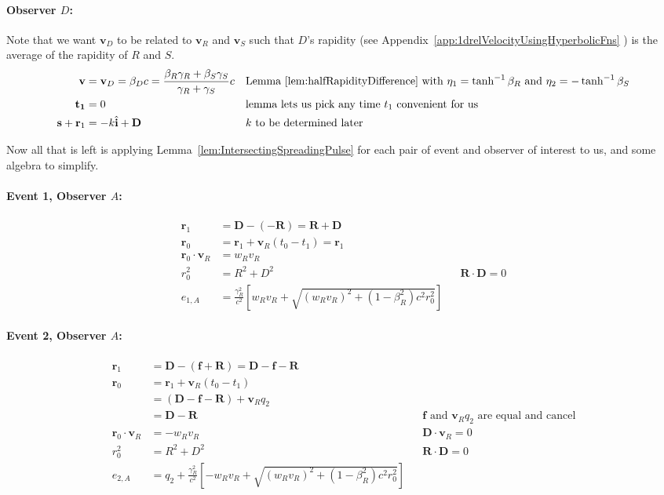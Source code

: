 \documentclass[a4paper]{article}
\theoremstyle{plain}
\theoremstyle{definition}
\newcommand{\vect}[1]{\mathbf{#1}}
\newcommand{\hatvec}[1]{\hat{\mathbf{#1}}}
\begin{document}
\paragraph{Observer $D$:}

Note that we want $\vect{v}_D$ to be related to $\vect{v}_R$ and
$\vect{v}_S$ such that $D$'s rapidity (see
Appendix~\ref{app:1drelVelocityUsingHyperbolicFns} ) is the average of
the rapidity of $R$ and $S$.
\begin{align}
\vect{v} & = \vect{v}_D = \beta_D c = \frac{\beta_R\gamma_R + \beta_S\gamma_S}{\gamma_R + \gamma_S} c & & \text{Lemma~\ref{lem:halfRapidityDifference} with $\eta_1 = \tanh^{-1}\beta_R$ and $\eta_2 = -\tanh^{-1}\beta_S$} \\
\vect{t_1} & = 0 & & \text{lemma lets us pick any time $t_1$ convenient for us} \\
\vect{s} + \vect{r}_1 & = -k\hatvec{i} + \vect{D} & & \text{$k$ to be determined later}
\end{align}

Now all that is left is applying
Lemma~\ref{lem:IntersectingSpreadingPulse} for each pair of event and
observer of interest to us, and some algebra to simplify.


\paragraph{Event 1, Observer $A$:}

\begin{align*}
\vect{r}_1 & = \vect{D} - (-\vect{R}) = \vect{R} + \vect{D} \\
\vect{r}_0 & = \vect{r}_1 + \vect{v}_R (t_0 - t_1) = \vect{r}_1 \\
\vect{r}_0 \cdot \vect{v}_R & = w_Rv_R \\
r_0^2 & = R^2 + D^2 & & \text{$\vect{R} \cdot \vect{D} = 0$} \\
e_{1,A} & = \frac{\gamma_R^2}{c^2} \left[ w_Rv_R + \sqrt{ (w_Rv_R)^2 + (1-\beta_R^2)c^2r_0^2 } \right]
\end{align*}


\paragraph{Event 2, Observer $A$:}

\begin{align*}
\vect{r}_1 & = \vect{D} - (\vect{f}+\vect{R}) = \vect{D} - \vect{f} - \vect{R} \\
\vect{r}_0
  & = \vect{r}_1 + \vect{v}_R (t_0 - t_1) \\
  & = (\vect{D} - \vect{f} - \vect{R}) + \vect{v}_R q_2 \\
  & = \vect{D} - \vect{R} & & \text{$\vect{f}$ and $\vect{v}_R q_2$ are equal and cancel} \\
\vect{r}_0 \cdot \vect{v}_R & = -w_Rv_R & & \text{$\vect{D} \cdot \vect{v}_R = 0$} \\
r_0^2 & = R^2 + D^2 & & \text{$\vect{R} \cdot \vect{D} = 0$} \\
e_{2,A} & = q_2 + \frac{\gamma_R^2}{c^2} \left[ -w_Rv_R + \sqrt{ (w_Rv_R)^2 + (1-\beta_R^2)c^2r_0^2 } \right]
\end{align*}
\end{document}
